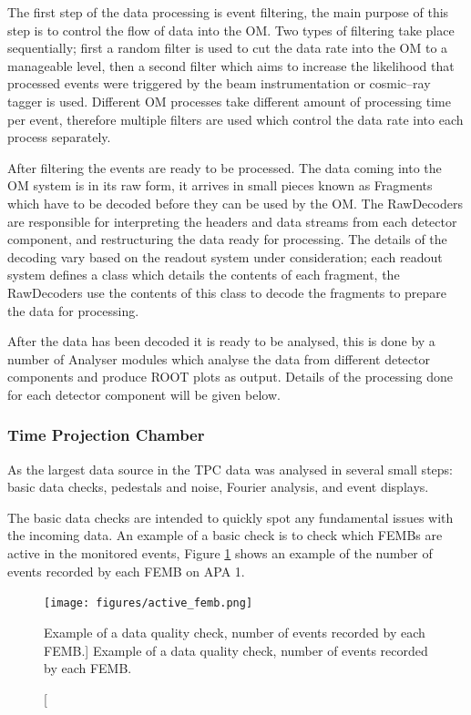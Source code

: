 The first step of the data processing is event filtering, the main purpose of
this step is to control the flow of data into the OM. Two types of filtering
take place sequentially; first a random filter is used to cut the data rate into
the OM to a manageable level, then a second filter which aims to increase the 
likelihood that processed events were triggered by the beam instrumentation or 
cosmic--ray tagger is used. Different OM processes take different amount of
processing time per event, therefore multiple filters are used which control the
data rate into each process separately.

After filtering the events are ready to be processed. The data coming into the
OM system is in its raw form, it arrives in small pieces known as Fragments
which have to be decoded before they can be used by the OM. The RawDecoders 
are responsible for interpreting the headers and data streams from each 
detector component, and restructuring the data ready for processing. The 
details of the decoding vary based on the readout system under consideration; 
each readout system defines a class which details the contents of each
fragment, the RawDecoders use the contents of this class to decode the fragments
to prepare the data for processing.

After the data has been decoded it is ready to be analysed, this is done by a
number of Analyser modules which analyse the data from different detector
components and produce ROOT \cite{ANTCHEVA20092499} plots as output. Details 
of the processing done for each detector component will be given below.

\subsubsection*{Time Projection Chamber}
As the largest data source in \protodune{} the TPC data was analysed in several
small steps: basic data checks, pedestals and noise, Fourier analysis, and event
displays.

The basic data checks are intended to quickly spot any fundamental issues with
the incoming data. An example of a basic check is to check which FEMBs are
active in the monitored events, Figure \ref{fig:active_femb} shows an example of
the number of events recorded by each FEMB on APA 1.

\begin{figure}

	\centering

	\texttt{[image: figures/active\_femb.png]}

	\caption
	[Example of a data quality check, number of events recorded by each FEMB.]
	{Example of a data quality check, number of events recorded by each FEMB.}

	\label{fig:active_femb}

\end{figure}




